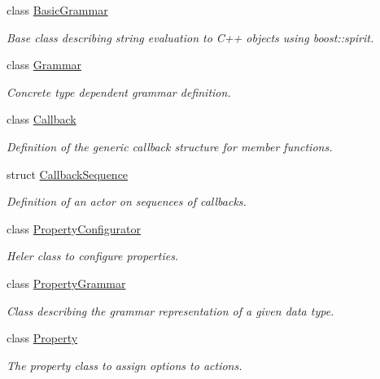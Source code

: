 \begin{DoxyCompactItemize}
\item 
class \hyperlink{class_d_d4hep_1_1_basic_grammar}{BasicGrammar}
\begin{DoxyCompactList}\small\item\em Base class describing string evaluation to C++ objects using boost::spirit. \item\end{DoxyCompactList}\item 
class \hyperlink{class_d_d4hep_1_1_grammar}{Grammar}
\begin{DoxyCompactList}\small\item\em Concrete type dependent grammar definition. \item\end{DoxyCompactList}\item 
class \hyperlink{class_d_d4hep_1_1_callback}{Callback}
\begin{DoxyCompactList}\small\item\em Definition of the generic callback structure for member functions. \item\end{DoxyCompactList}\item 
struct \hyperlink{struct_d_d4hep_1_1_callback_sequence}{CallbackSequence}
\begin{DoxyCompactList}\small\item\em Definition of an actor on sequences of callbacks. \item\end{DoxyCompactList}\item 
class \hyperlink{class_d_d4hep_1_1_property_configurator}{PropertyConfigurator}
\begin{DoxyCompactList}\small\item\em Heler class to configure properties. \item\end{DoxyCompactList}\item 
class \hyperlink{class_d_d4hep_1_1_property_grammar}{PropertyGrammar}
\begin{DoxyCompactList}\small\item\em Class describing the grammar representation of a given data type. \item\end{DoxyCompactList}\item 
class \hyperlink{class_d_d4hep_1_1_property}{Property}
\begin{DoxyCompactList}\small\item\em The property class to assign options to actions. \item\end{DoxyCompactList}\item 

\end{DoxyCompactItemize}

